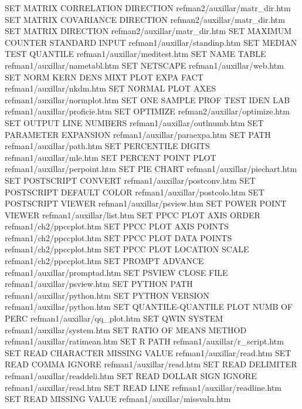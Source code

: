 SET MATRIX CORRELATION DIRECTION        refman2/auxillar/matr_dir.htm
SET MATRIX COVARIANCE DIRECTION         refman2/auxillar/matr_dir.htm
SET MATRIX DIRECTION                    refman2/auxillar/matr_dir.htm
SET MAXIMUM COUNTER STANDARD INPUT      refman1/auxillar/standinp.htm
SET MEDIAN TEST QUANTILE                refman1/auxillar/meditest.htm
SET NAME TABLE                          refman1/auxillar/nametabl.htm
SET NETSCAPE                            refman1/auxillar/web.htm
SET NORM KERN DENS MIXT PLOT EXPA FACT  refman1/auxillar/nkdm.htm
SET NORMAL PLOT AXES                    refman1/auxillar/normplot.htm
SET ONE SAMPLE PROF TEST IDEN LAB       refman1/auxillar/proficie.htm
SET OPTIMIZE                            refman2/auxillar/optimize.htm
SET OUTPUT LINE NUMBERS                 refman1/auxillar/outlnumb.htm
SET PARAMETER EXPANSION                 refman1/auxillar/paraexpa.htm
SET PATH                                refman1/auxillar/path.htm
SET PERCENTILE DIGITS                   refman1/auxillar/mle.htm
SET PERCENT POINT PLOT                  refman1/auxillar/perpoint.htm
SET PIE CHART                           refman1/auxillar/piechart.htm
SET POSTSCRIPT CONVERT                  refman1/auxillar/postconv.htm
SET POSTSCRIPT DEFAULT COLOR            refman1/auxillar/postcolo.htm
SET POSTSCRIPT VIEWER                   refman1/auxillar/psview.htm
SET POWER POINT VIEWER                  refman1/auxillar/list.htm
SET PPCC PLOT AXIS ORDER                refman1/ch2/ppccplot.htm
SET PPCC PLOT AXIS POINTS               refman1/ch2/ppccplot.htm
SET PPCC PLOT DATA POINTS               refman1/ch2/ppccplot.htm
SET PPCC PLOT LOCATION SCALE            refman1/ch2/ppccplot.htm
SET PROMPT ADVANCE                      refman1/auxillar/promptad.htm
SET PSVIEW CLOSE FILE                   refman1/auxillar/psview.htm
SET PYTHON PATH                         refman1/auxillar/python.htm
SET PYTHON VERSION                      refman1/auxillar/python.htm
SET QUANTILE-QUANTILE PLOT NUMB OF PERC refman1/auxillar/qq_plot.htm
SET QWIN SYSTEM                         refman1/auxillar/system.htm
SET RATIO OF MEANS METHOD               refman1/auxillar/ratimean.htm
SET R PATH                              refman1/auxillar/r_script.htm
SET READ CHARACTER MISSING VALUE        refman1/auxillar/read.htm
SET READ COMMA IGNORE                   refman1/auxillar/read.htm
SET READ DELIMITER                      refman1/auxillar/readdeli.htm
SET READ DOLLAR SIGN IGNORE             refman1/auxillar/read.htm
SET READ LINE                           refman1/auxillar/readline.htm
SET READ MISSING VALUE                  refman1/auxillar/missvalu.htm
